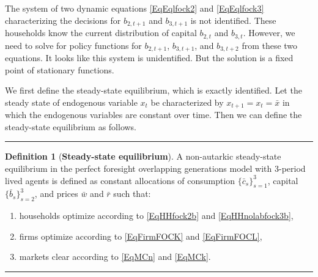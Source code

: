 \documentclass[letterpaper,12pt]{article}
\theoremstyle{definition}
\newtheorem{definition}[theorem]{Definition}
\numberwithin{equation}{section}
\numberwithin{exercise}{section}
\begin{document}
\begin{spacing}{1.5}
      The system of two dynamic equations \eqref{EqEqlfock2} and \eqref{EqEqlfock3} characterizing the decisions for $b_{2,t+1}$ and $b_{3,t+1}$ is not identified. These households know the current distribution of capital $b_{2,t}$ and $b_{3,t}$. However, we need to solve for policy functions for $b_{2,t+1}$, $b_{3,t+1}$, and $b_{3,t+2}$ from these two equations. It looks like this system is unidentified. But the solution is a fixed point of stationary functions.

      We first define the steady-state equilibrium, which is exactly identified. Let the steady state of endogenous variable $x_t$ be characterized by $x_{t+1}=x_t=\bar{x}$ in which the endogenous variables are constant over time. Then we can define the steady-state equilibrium as follows.

      \end{spacing}
      \vspace{5mm}
      \hrule
      \vspace{-1mm}
      \begin{definition}[\textbf{Steady-state equilibrium}]\label{Def3perSimpSSEql}
         A non-autarkic steady-state equilibrium in the perfect foresight overlapping generations model with $3$-period lived agents is defined as constant allocations of consumption $\{\bar{c}_s\}_{s=1}^3$, capital $\{\bar{b}_s\}_{s=2}^3$, and prices $\bar{w}$ and $\bar{r}$ such that:
         \begin{enumerate}
            \item households optimize according to \eqref{EqHHfock2b} and \eqref{EqHHnolabfock3b},
            \item firms optimize according to \eqref{EqFirmFOCK} and \eqref{EqFirmFOCL},
            \item markets clear according to \eqref{EqMCn} and \eqref{EqMCk}.
         \end{enumerate}
      \end{definition}
      \vspace{-2mm}
      \hrule
      \vspace{5mm}
\end{document}
